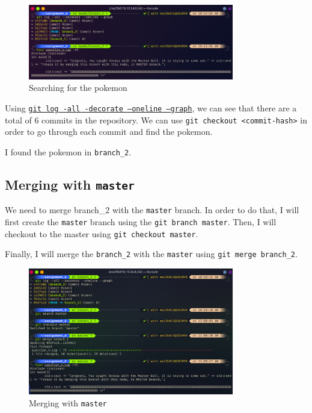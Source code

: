 \documentclass[12pt]{report}
\begin{document}
\begin{figure}[H]
    \centering
    \includegraphics[width=0.8\textwidth]{1_2_1.png}
    \caption{Searching for the pokemon}
\end{figure}

Using \href{https://stackoverflow.com/questions/43549304/how-to-understand-the-graph-output-of-git-log-all-graph-oneline-decorat}{\texttt{git log -all -decorate --oneline --graph}}, we can see that there are a total of 6 commits in the repository. We can use \texttt{git checkout <commit-hash>} in order to go through each commit and find the pokemon.

I found the pokemon in \texttt{branch\_2}.

\subsection{Merging with \texttt{master}}

We need to merge branch\_2 with the \texttt{master} branch. In order to do that, I will first create the \texttt{master} branch using the \texttt{git branch master}. Then, I will checkout to the master using \texttt{git checkout master}.

Finally, I will merge the \texttt{branch\_2} with the \texttt{master} using \texttt{git merge branch\_2}.

\begin{figure}[H]
    \centering
    \includegraphics[width=0.8\textwidth]{1_2_2.png}
    \caption{Merging with \texttt{master}}
\end{figure}
\end{document}
